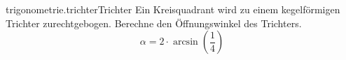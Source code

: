 \begin{exercise}{trigonometrie.trichter}{Trichter}
  \ifproblem\problem
    Ein Kreisquadrant wird zu einem kegelförmigen Trichter zurechtgebogen.
    Berechne den Öffnungswinkel des Trichters.
  \fi
  \ifoutline\outline
    \begin{equation*}
      \alpha=2\cdot\arcsin\left(\frac{1}{4}\right)
    \end{equation*}
  \fi
\end{exercise}
